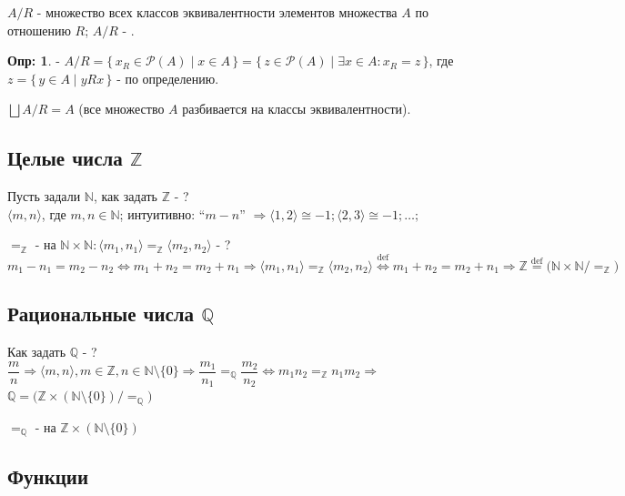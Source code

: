 \documentclass[12pt]{article}
\theoremstyle{definition}
\newtheorem{defn}{Опр:}
\begin{document}
$A/R$ - множество всех классов эквивалентности элементов множества $A$ по отношению $R$; $A/R$ - .

\begin{defn}
	 - $A/R = \{\,x_R \in \mathcal{P}(A) \mid x \in A\,\} = \{\,z \in \mathcal{P}(A) \mid \exists x\in A\colon x_R = z\,\}$, где $z = \{\,y \in A \mid yRx\,\}$ - по определению.
\end{defn}
	
$\bigsqcup A/R = A$ (все множество $A$ разбивается на классы эквивалентности).	

\subsection*{Целые числа $\mathbb{Z}$}
Пусть задали $\mathbb{N}$, как задать $\mathbb{Z}$ - ? \\
$\langle m,n \rangle$, где $m, n \in \mathbb{N}$; интуитивно: ``$m-n$'' $\Rightarrow \langle 1,2 \rangle	 \cong -1; \langle 2,3 \rangle	 \cong -1; \dotsc ;$

$=_\mathbb{Z}$ -  на $\mathbb{N}\times \mathbb{N}: \langle m_1, n_1 \rangle =_\mathbb{Z} \langle m_2, n_2 \rangle$ - ?\\
$$m_1 - n_1 = m_2 - n_2 \Leftrightarrow m_1 + n_2 = m_2 + n_1 \Rightarrow \langle m_1, n_1 \rangle =_\mathbb{Z} \langle m_2, n_2 \rangle \overset{\text{def}}{\Leftrightarrow} m_1 + n_2 = m_2 + n_1 \Rightarrow \mathbb{Z} \overset{\text{def}}{=} \big(\mathbb{N} \times \mathbb{N}/=_\mathbb{Z} \big)$$

\subsection*{Рациональные числа $\mathbb{Q}$}

Как задать $\mathbb{Q}$ - ?  $\dfrac{m}{n} \Rightarrow \langle m,n \rangle, m \in \mathbb{Z}, n \in \mathbb{N}\setminus\{0\} \Rightarrow \dfrac{m_1}{n_1} =_\mathbb{Q} \dfrac{m_2}{n_2} \Leftrightarrow m_1n_2 =_\mathbb{Z} n_1m_2 \Rightarrow$ \\
$\mathbb{Q} = \big(\mathbb{Z} \times (\mathbb{N}\setminus \{0\})/=_\mathbb{Q} \big)$
	
$=_\mathbb{Q}$ -  на $\mathbb{Z} \times (\mathbb{N}\setminus \{0\})$

\subsection*{Функции}
\end{document}
